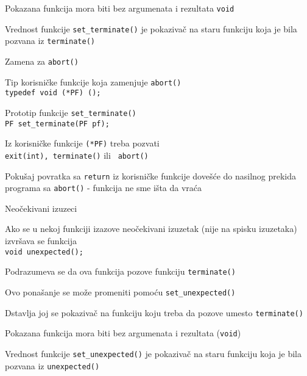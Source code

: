 \documentclass{article}
\newenvironment{xitemize}{%
    
    \itemize
    \larger
}{%
    \enditemize
}
\let\olditemize\itemize
\let\endolditemize\enditemize
\renewenvironment{itemize}{%
    \smaller
    \olditemize
}{%
    \endolditemize
}
\providecommand{\inlinecode}[1]{\texttt{#1}}
\begin{document}
\begin{xitemize}
\begin{itemize}
\begin{itemize}
        \item Pokazana funkcija mora biti bez argumenata i rezultata \inlinecode{void}
        \item Vrednost funkcije \inlinecode{set\_terminate()} je pokazivač na staru funkciju koja je bila pozvana iz \inlinecode{terminate()}
    \end{itemize}
\end{itemize}
\item Zamena za \inlinecode{abort()}
\begin{itemize}
    \item Tip korisničke funkcije koja zamenjuje  \inlinecode{abort()}\\
    \inlinecode{typedef void (*PF) ();}
    \item Prototip funkcije \inlinecode{set\_terminate()}\\
    \inlinecode{PF set\_terminate(PF pf);}
    \item Iz korisničke funkcije \inlinecode{(*PF)} treba pozvati \\
    \inlinecode{exit(int), terminate()} ili \inlinecode{ abort()}
    \item Pokušaj povratka sa \inlinecode{return} iz korisničke funkcije dovešće do nasilnog prekida programa sa \inlinecode{abort()} - funkcija ne sme išta da vraća
\end{itemize}
\item Neočekivani izuzeci
\begin{itemize}
    \item Ako se u nekoj funkciji izazove neočekivani izuzetak (nije na spisku izuzetaka) izvršava se funkcija \\
    \inlinecode{void unexpected();}
    \item Podrazumeva se da ova funkcija pozove funkciju \inlinecode{terminate()}
    \item Ovo ponašanje se može promeniti pomoću \inlinecode{set\_unexpected()}
    \begin{itemize}
        \item Dstavlja joj se pokazivač na funkciju koju treba da pozove umesto \inlinecode{terminate()}
        \item Pokazana funkcija mora biti bez argumenata i rezultata (\inlinecode{void})
        \item Vrednost funkcije \inlinecode{set\_unexpected()} je pokazivač na staru funkciju koja je bila pozvana iz \inlinecode{unexpected()}
    \end{itemize}
\end{itemize}

\end{xitemize}
\end{document}
